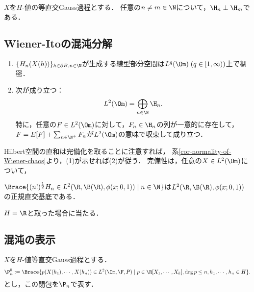 \documentclass[uplatex,dvipdfmx]{jsreport}
\begin{document}
\begin{corollary}\label{cor-normality-of-Wiener-chaos}
    $X$を$H$-値の等直交Gauss過程とする．
    任意の$n\ne m\in\N$について，$\H_n\perp\H_m$である．
\end{corollary}

\subsection{Wiener-Itoの混沌分解}

\begin{theorem}\mbox{}\label{thm-Wiener-Ito-chaotic-decomposition}
    \begin{enumerate}
        \item $\{H_n(X(h))\}_{h\in\partial B,n\in\N}$が生成する線型部分空間は$L^q(\Om)\;(q\in[1,\infty))$上で稠密．
        \item 次が成り立つ：
        \[L^2(\Om)=\bigoplus_{n\in\N}\H_n.\]
        特に，任意の$F\in L^2(\Om)$に対して，$F_n\in\H_n$の列が一意的に存在して，$F=E[F]+\sum_{n\in\N^+}F_n$が$L^2(\Om)$の意味で収束して成り立つ．
    \end{enumerate}
\end{theorem}
\begin{Proof}
    Hilbert空間の直和は完備化を取ることに注意すれば，
    系\ref{cor-normality-of-Wiener-chaos}より，(1)が示せれば(2)が従う．
    完備性は，任意の$X\in L^2(\Om)$について，
\end{Proof}

\begin{corollary}[1次元の場合の結論]
    $\Brace{(n!)^{\frac{1}{2}}H_n\in L^2(\R,\B(\R),\phi(x;0,1))\mid n\in\N}$は$L^2(\R,\B(\R),\phi(x;0,1))$の正規直交基底である．
\end{corollary}
\begin{Proof}
    $H=\R$と取った場合に当たる．
\end{Proof}

\subsection{混沌の表示}

\begin{definition}
    $X$を$H$-値等直交Gauss過程とする．
    \[\P^0_n:=\Brace{p(X(h_1),\cdots,X(h_n))\in L^2(\Om,\F,P)\mid p\in\R[X_1,\cdots,X_k],\deg p\le n,h_1,\cdots,h_n\in H}.\]
    とし，この閉包を$\P_n$で表す．
\end{definition}
\end{document}
